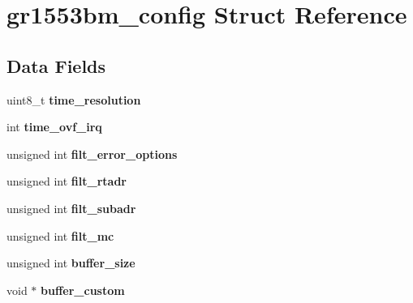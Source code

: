 \hypertarget{structgr1553bm__config}{}\section{gr1553bm\+\_\+config Struct Reference}
\label{structgr1553bm__config}
\subsection*{Data Fields}
\begin{DoxyCompactItemize}
\item 
\mbox{\label{structgr1553bm__config_af173231d3ef943a68292a2aaa40044f4}} 
uint8\+\_\+t {\bfseries time\+\_\+resolution}
\item 
\mbox{\label{structgr1553bm__config_a45188dd09fb41f9474c408d5001b6949}} 
int {\bfseries time\+\_\+ovf\+\_\+irq}
\item 
\mbox{\label{structgr1553bm__config_a8957ec647a8e94c3fff6972be3b4e033}} 
unsigned int {\bfseries filt\+\_\+error\+\_\+options}
\item 
\mbox{\label{structgr1553bm__config_a93a797750d765ef6f18761b41cfbb17e}} 
unsigned int {\bfseries filt\+\_\+rtadr}
\item 
\mbox{\label{structgr1553bm__config_abf1102df239d260330fd77232903c2fa}} 
unsigned int {\bfseries filt\+\_\+subadr}
\item 
\mbox{\label{structgr1553bm__config_adba894b9df7d18ea75978c3012ba78ec}} 
unsigned int {\bfseries filt\+\_\+mc}
\item 
\mbox{\label{structgr1553bm__config_a4ff0d214d8a68c7f030960c36582b95a}} 
unsigned int {\bfseries buffer\+\_\+size}
\item 
\mbox{\label{structgr1553bm__config_a8b89f5130020247571863880cd6372e5}} 
void $\ast$ {\bfseries buffer\+\_\+custom}
\item 
\mbox{\label{structgr1553bm__config_a1e8c2db46c7ed28034a0aa5dc6d09056}} 

\end{DoxyCompactItemize}
